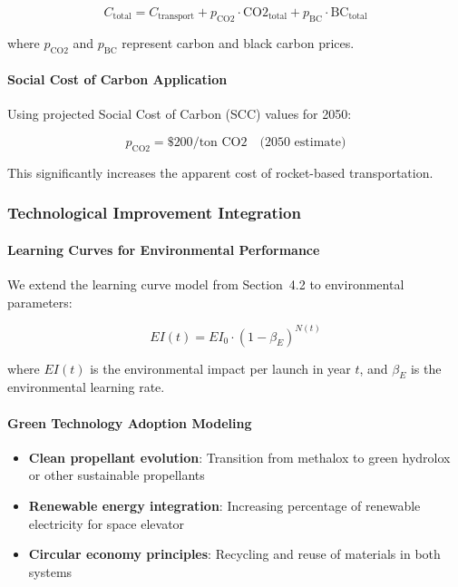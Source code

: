\documentclass{mcmthesis}
\begin{document}
\[
    C_{\text{total}} = C_{\text{transport}} + p_{\text{CO2}} \cdot \text{CO2}_{\text{total}} + p_{\text{BC}} \cdot \text{BC}_{\text{total}}
\]

where \(p_{\text{CO2}}\) and \(p_{\text{BC}}\) represent carbon and black carbon prices.

\paragraph{Social Cost of Carbon Application}

Using projected Social Cost of Carbon (SCC) values for 2050:

\[
    p_{\text{CO2}} = \$200/\text{ton CO2} \quad \text{(2050 estimate)}
\]

This significantly increases the apparent cost of rocket-based transportation.

\subsubsection{Technological Improvement Integration}

\paragraph{Learning Curves for Environmental Performance}

We extend the learning curve model from Section~4.2 to environmental parameters:

\[
    EI(t) = EI_0 \cdot (1 - \beta_E)^{N(t)}
\]

where \(EI(t)\) is the environmental impact per launch in year \(t\), and \(\beta_E\) is the environmental learning rate.

\paragraph{Green Technology Adoption Modeling}
\begin{itemize}
    \item \textbf{Clean propellant evolution}: Transition from methalox to green hydrolox or other sustainable propellants
    \item \textbf{Renewable energy integration}: Increasing percentage of renewable electricity for space elevator
    \item \textbf{Circular economy principles}: Recycling and reuse of materials in both systems
\end{itemize}
\end{document}
